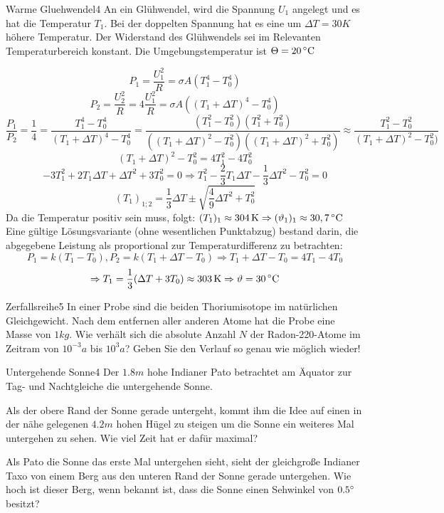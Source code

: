 



\begin{problem}{Warme Gluehwendel}{4}
An ein Glühwendel, wird die Spannung $U_1$ angelegt und es hat die Temperatur $T_1$. Bei der doppelten Spannung hat es eine um $\Delta T=30\unit{K}$ höhere Temperatur. Der Widerstand des Glühwendels sei im Relevanten Temperaturbereich konstant. Die Umgebungstemperatur ist $\Theta=20\,\mathrm{^\circ C}$
\begin{solution}
$$P_1=\frac{U_1^2}R=\sigma A (T_1^4 - T_0^4)$$
$$P_2=\frac{U_2^2}R=4\frac{U_1^2}R=\sigma A ((T_1+\Delta T)^4-T_0^4)$$
$$\frac{P_1}{P_2}=\frac 14=\frac{T_1^4-T_0^4}{(T_1+\Delta T)^4-T_0^4}=\frac{(T_1^2-T_0^2)(T_1^2+T_0^2)}{((T_1+\Delta T)^2-T_0^2)((T_1+\Delta T)^2+T_0^2)}\approx\frac{T_1^2-T_0^2}{(T_1+\Delta T)^2-T_0^2)}$$
$$(T_1+\Delta T)^2-T_0^2=4T_1^2-4T_0^2$$
$$-3T_1^2+2T_1\Delta T+\Delta T^2+3T_0^2=0 \Rightarrow T_1^2-\frac 23 T_1\Delta T-\frac 13 \Delta T^2-T_0^2=0$$
$$(T_1)_{1;2}=\frac 13\Delta T\pm\sqrt{\frac 49\Delta T^2+T_0^2}$$
Da die Temperatur positiv sein muss, folgt: $(T_1)_1\approx 304\,\mathrm{K} \Rightarrow (\vartheta_1)_1 \approx 30,7\,\mathrm{^\circ C}$
Eine gültige Lösungsvariante (ohne wesentlichen Punktabzug) bestand darin, die abgegebene Leistung als proportional zur Temperaturdifferenz zu betrachten:
$$P_1=k(T_1-T_0), P_2=k(T_1+\Delta T-T_0) \Rightarrow T_1+\Delta T-T_0=4T_1-4T_0$$
$$\Rightarrow T_1=\frac 13(\Delta T+3T_0)\approx 303\,\mathrm{K}\Rightarrow \vartheta=30\,\mathrm{^\circ C}$$
\end{solution}
\end{problem}

\begin{problem}{Zerfallsreihe}{5}
In einer Probe sind die beiden Thoriumisotope im natürlichen Gleichgewicht. Nach dem entfernen aller anderen Atome hat die Probe eine Masse von $1 \unit{kg}$. Wie verhält sich die absolute Anzahl $N$ der Radon-220-Atome im Zeitram von $10^{-3}\unit{a}$ bis $10^3\unit{a}$? Geben Sie den Verlauf so genau wie möglich wieder!
\end{problem}

\begin{problem}{Untergehende Sonne}{4}
Der $1.8\unit{m}$ hohe Indianer Pato betrachtet am Äquator zur Tag- und Nachtgleiche die untergehende Sonne.
 \begin{abcenum}
  \item Als der obere Rand der Sonne gerade untergeht, kommt ihm die Idee auf einen in der nähe gelegenen $4.2 \unit{m}$ hohen Hügel zu steigen um die Sonne ein weiteres Mal untergehen zu sehen. Wie viel Zeit hat er dafür maximal?
  \item Als Pato die Sonne das erste Mal untergehen sieht, sieht der gleichgroße Indianer Taxo von einem Berg aus den unteren Rand der Sonne gerade untergehen. Wie hoch ist dieser Berg, wenn bekannt ist, dass die Sonne einen Sehwinkel von $0.5 ^\circ$ besitzt?
 \end{abcenum}
\end{problem}

